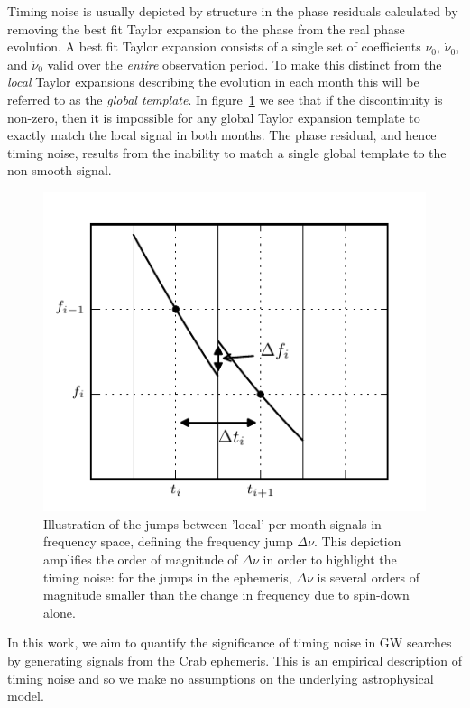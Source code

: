 \documentclass[../full_thesis/full_thesis.tex]{subfiles}
\begin{document}
Timing noise is usually depicted by structure in the phase residuals calculated
by removing the best fit Taylor expansion to the phase from the real phase
evolution. A best fit Taylor expansion consists of a single set of coefficients
$\nu_{0}$, $\dot{\nu}_{0}$, and $\ddot{\nu}_{0}$ valid over the \emph{entire}
observation period. To make this distinct from the \emph{local} Taylor
expansions describing the evolution in each month this will be referred to as
the \emph{global template}.  In figure~\ref{fig: template jumps} we see that if
the discontinuity is non-zero, then it is impossible for any global Taylor
expansion template to exactly match the local signal in both months. The
phase residual, and hence timing noise, results from the inability to match a
single global template to the non-smooth signal.

\begin{figure}[htb]
\centering
    \includegraphics{template_jumps}
\caption{Illustration of the jumps between 'local' per-month signals in
    frequency space, defining the frequency jump $\Delta \nu$. This
        depiction amplifies the order of magnitude of $\Delta \nu$ in order to
        highlight the timing noise: for the jumps in the ephemeris, $\Delta \nu$
        is several orders of magnitude smaller than the change in frequency
        due to spin-down alone.}
\label{fig: template jumps}
\end{figure}

In this work, we aim to quantify the significance of timing
noise in GW searches by generating signals from the Crab ephemeris. This
is an empirical description of timing noise and so we
make no assumptions on the underlying astrophysical model.
\end{document}

